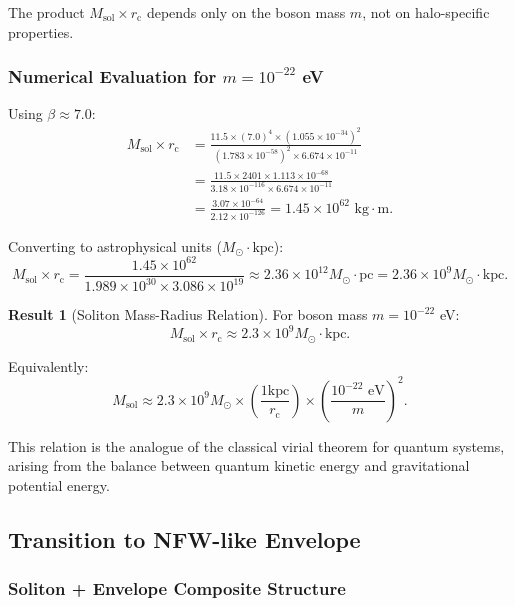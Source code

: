 \documentclass[11pt,a4paper]{article}
\newcommand{\ee}[1]{\times 10^{#1}}
\newcommand{\Msun}{\ensuremath{M_\odot}}
\newcommand{\Msol}{\ensuremath{M_{\mathrm{sol}}}}
\newcommand{\kpc}{\ensuremath{\mathrm{kpc}}}
\newcommand{\rc}{\ensuremath{r_{\mathrm{c}}}}
\theoremstyle{definition}
\newtheorem{result}{Result}[section]
\theoremstyle{remark}
\begin{document}
The product $\Msol \times \rc$ depends only on the boson mass $m$, not on halo-specific properties.

\subsubsection{Numerical Evaluation for $m = 10^{-22}$ eV}

Using $\beta \approx 7.0$:
\begin{align}
\Msol \times \rc &= \frac{11.5 \times (7.0)^4 \times (1.055 \ee{-34})^2}{(1.783 \ee{-58})^2 \times 6.674 \ee{-11}} \\
&= \frac{11.5 \times 2401 \times 1.113 \ee{-68}}{3.18 \ee{-116} \times 6.674 \ee{-11}} \\
&= \frac{3.07 \ee{-64}}{2.12 \ee{-126}} = 1.45 \ee{62} \text{ kg} \cdot \text{m}.
\end{align}

Converting to astrophysical units ($\Msun \cdot \kpc$):
\begin{equation}
\Msol \times \rc = \frac{1.45 \ee{62}}{1.989 \ee{30} \times 3.086 \ee{19}} \approx 2.36 \ee{12} \Msun \cdot \text{pc} = 2.36 \ee{9} \Msun \cdot \kpc.
\end{equation}

\begin{result}[Soliton Mass-Radius Relation]
For boson mass $m = 10^{-22}$ eV:
\begin{equation}
\boxed{\Msol \times \rc \approx 2.3 \times 10^9 \Msun \cdot \kpc.}
\end{equation}

Equivalently:
\begin{equation}
\Msol \approx 2.3 \ee{9} \Msun \times \left(\frac{1 \kpc}{\rc}\right) \times \left(\frac{10^{-22} \text{ eV}}{m}\right)^2.
\end{equation}

This relation is the analogue of the classical virial theorem for quantum systems, arising from the balance between quantum kinetic energy and gravitational potential energy.
\end{result}

\subsection{Transition to NFW-like Envelope}
\label{sec:NFW_transition}

\subsubsection{Soliton + Envelope Composite Structure}
\end{document}
